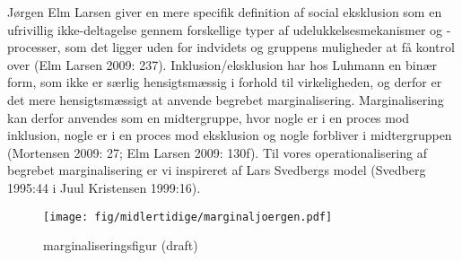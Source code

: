 Jørgen Elm Larsen giver en mere specifik definition af social eksklusion som en ufrivillig ikke-deltagelse gennem forskellige typer af udelukkelsesmekanismer og -processer, som det ligger uden for indvidets og gruppens muligheder at få kontrol over (Elm Larsen 2009: 237). Inklusion/eksklusion har hos Luhmann en binær form, som ikke er særlig hensigtsmæssig i forhold til virkeligheden, og derfor er det mere hensigtsmæssigt at anvende begrebet marginalisering. Marginalisering kan derfor anvendes som en midtergruppe, hvor nogle er i en proces mod inklusion, nogle er i en proces mod eksklusion og nogle forbliver i midtergruppen  (Mortensen 2009: 27; Elm Larsen 2009: 130f). Til vores operationalisering af begrebet marginalisering er vi inspireret af Lars Svedbergs model (Svedberg 1995:44 i Juul Kristensen 1999:16).
\begin{figure}[h]
\begin{centering}
	\caption{marginaliseringsfigur (draft)}
  	\texttt{[image: fig/midlertidige/marginaljoergen.pdf]}
  	\label{fig_marginaljoergen}
\end{centering}
\end{figure}
%

